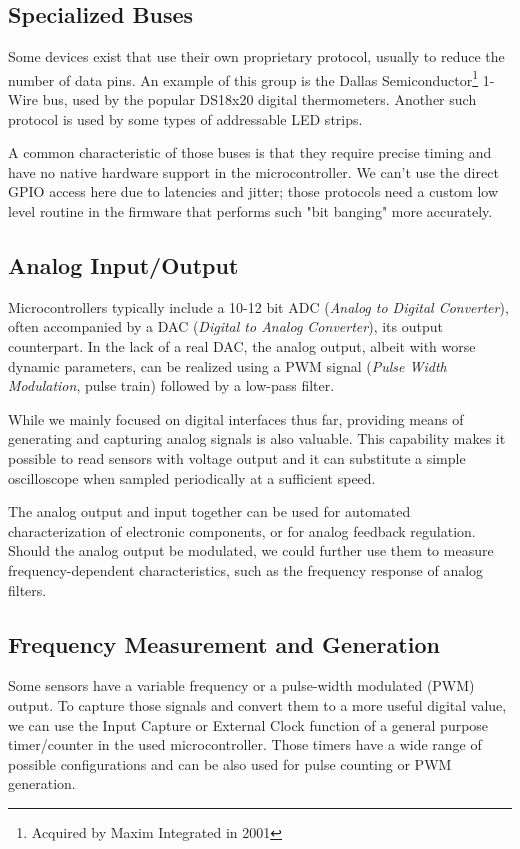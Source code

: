 \subsection{Specialized Buses}

Some devices exist that use their own proprietary protocol, usually to reduce the number of data pins. An example of this group is the Dallas Semiconductor\footnote{Acquired by Maxim Integrated in 2001} 1-Wire bus, used by the popular DS18x20 digital thermometers. Another such protocol is used by some types of addressable LED strips.

A common characteristic of those buses is that they require precise timing and have no native hardware support in the microcontroller. We can't use the direct GPIO access here due to latencies and jitter; those protocols need a custom low level routine in the firmware that performs such "bit banging" more accurately.

\subsection{Analog Input/Output}

Microcontrollers typically include a 10-12 bit ADC (\textit{Analog to Digital Converter}), often accompanied by a DAC (\textit{Digital to Analog Converter}), its output counterpart. In the lack of a real DAC, the analog output, albeit with worse dynamic parameters, can be realized using a PWM signal (\textit{Pulse Width Modulation}, pulse train) followed by a low-pass filter.

While we mainly focused on digital interfaces thus far, providing means of generating and capturing analog signals is also valuable. This capability makes it possible to read sensors with voltage output and it can substitute a simple oscilloscope when sampled periodically at a sufficient speed.

The analog output and input together can be used for automated characterization of electronic components, or for analog feedback regulation. Should the analog output be modulated, we could further use them to measure frequency-dependent characteristics, such as the frequency response of analog filters.

\subsection{Frequency Measurement and Generation}

Some sensors have a variable frequency or a pulse-width modulated (PWM) output. To capture those signals and convert them to a more useful digital value, we can use the Input Capture or External Clock function of a general purpose timer/counter in the used microcontroller. Those timers have a wide range of possible configurations and can be also used for pulse counting or PWM generation.


